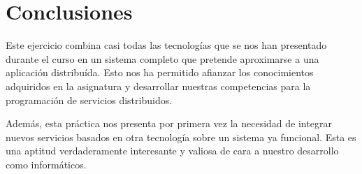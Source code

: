 \documentclass[]{article}
\begin{document}
\section{Conclusiones}
\label{sec:conclusiones}
Este ejercicio combina casi todas las tecnologías que se nos han presentado durante el curso en un sistema completo que pretende aproximarse a una aplicación distribuída. Esto nos ha permitido afianzar los conocimientos adquiridos en la asignatura y desarrollar nuestras competencias para la programación de servicios distribuidos. 

Además, esta práctica nos presenta por primera vez la necesidad de integrar nuevos servicios basados en otra tecnología sobre un sistema ya funcional. Esta es una aptitud verdaderamente interesante y valiosa de cara a nuestro desarrollo como informáticos.
\end{document}
